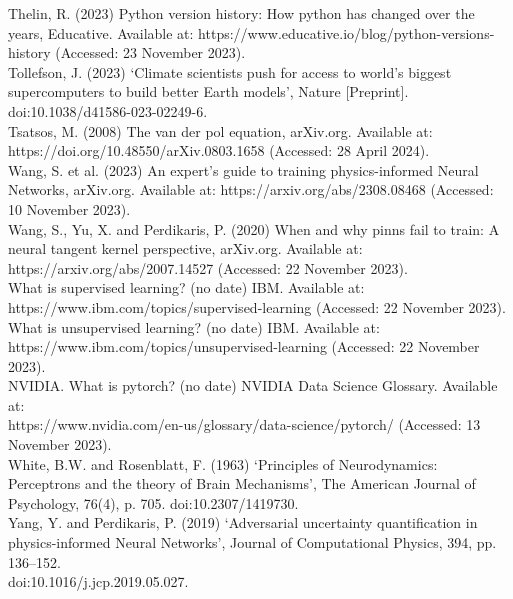 \documentclass[12pt, openany]{book}
\begin{document}
Thelin, R. (2023) Python version history: How python has changed over the years, Educative. Available at: https://www.educative.io/blog/python-versions-history (Accessed: 23 November 2023). \\

Tollefson, J. (2023) ‘Climate scientists push for access to world’s biggest supercomputers to build better Earth models’, Nature [Preprint]. doi:10.1038/d41586-023-02249-6. \\

Tsatsos, M. (2008) The van der pol equation, arXiv.org. Available at: https://doi.org/10.48550/arXiv.0803.1658 (Accessed: 28 April 2024). \\

Wang, S. et al. (2023) An expert’s guide to training physics-informed Neural Networks, arXiv.org. Available at: https://arxiv.org/abs/2308.08468 (Accessed: 10 November 2023). \\

Wang, S., Yu, X. and Perdikaris, P. (2020) When and why pinns fail to train: A neural tangent kernel perspective, arXiv.org. Available at: https://arxiv.org/abs/2007.14527 (Accessed: 22 November 2023). \\

What is supervised learning? (no date) IBM. Available at: \\ https://www.ibm.com/topics/supervised-learning (Accessed: 22 November 2023). \\

What is unsupervised learning? (no date) IBM. Available at: \\ https://www.ibm.com/topics/unsupervised-learning (Accessed: 22 November 2023). \\

NVIDIA. What is pytorch? (no date) NVIDIA Data Science Glossary. Available at: \\ https://www.nvidia.com/en-us/glossary/data-science/pytorch/ (Accessed: 13 November 2023). \\

White, B.W. and Rosenblatt, F. (1963) ‘Principles of Neurodynamics: Perceptrons and the theory of Brain Mechanisms’, The American Journal of Psychology, 76(4), p. 705. doi:10.2307/1419730. \\

Yang, Y. and Perdikaris, P. (2019) ‘Adversarial uncertainty quantification in physics-informed Neural Networks’, Journal of Computational Physics, 394, pp. 136–152. \\ doi:10.1016/j.jcp.2019.05.027. \\
\end{document}
